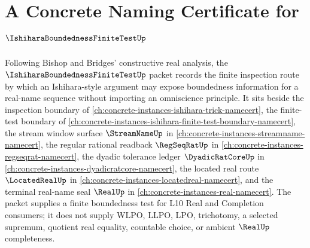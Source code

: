 \chapter{A Concrete Naming Certificate for $\IshiharaBoundednessFiniteTestUp$}
\label{ch:concrete-instances-ishihara-boundedness-finite-test-namecert}

Following Bishop and Bridges' constructive real analysis, the $\IshiharaBoundednessFiniteTestUp$ packet records the finite inspection route by which an Ishihara-style argument may expose boundedness information for a real-name sequence without importing an omniscience principle. It sits beside the inspection boundary of \autoref{ch:concrete-instances-ishihara-trick-namecert}, the finite-test boundary of \autoref{ch:concrete-instances-ishihara-finite-test-boundary-namecert}, the stream window surface $\StreamNameUp$ in \autoref{ch:concrete-instances-streamname-namecert}, the regular rational readback $\RegSeqRatUp$ in \autoref{ch:concrete-instances-regseqrat-namecert}, the dyadic tolerance ledger $\DyadicRatCoreUp$ in \autoref{ch:concrete-instances-dyadicratcore-namecert}, the located real route $\LocatedRealUp$ in \autoref{ch:concrete-instances-locatedreal-namecert}, and the terminal real-name seal $\RealUp$ in \autoref{ch:concrete-instances-real-namecert}. The packet supplies a finite boundedness test for L10 Real and Completion consumers; it does not supply WLPO, LLPO, LPO, trichotomy, a selected supremum, quotient real equality, countable choice, or ambient $\RealUp$ completeness.

